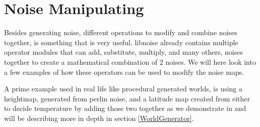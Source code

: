 \section{Noise Manipulating}
\label{NoiseManipulating}
Besides generating noise, different operations to modify and combine noises together, is something that is very useful. libnoise already contains multiple operator modules that can add, substitute, multiply, and many others, noises together to create a mathematical combination of 2 noises. We will here look into a few examples of how these operators can be used to modify the noise maps.

A prime example used in real life like procedural generated worlds, is using a heightmap, generated from perlin noise, and a latitude map created from either to decide temperature by adding those two together as we demonstrate in  and will be describing more in depth in section \ref{WorldGenerator}.

